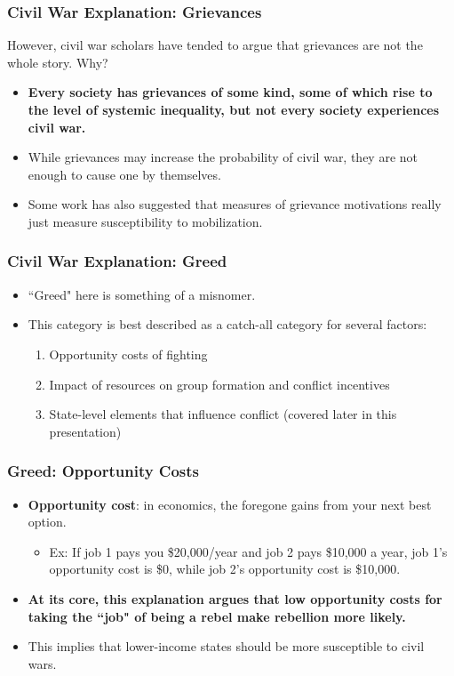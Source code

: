 \documentclass{beamer}
\begin{document}
\begin{frame} 
	\frametitle{\LARGE{Civil War Explanation: Grievances}}
However, civil war scholars have tended to argue that grievances are not the whole story. Why?
	\begin{itemize}
		\item \textbf{Every society has grievances of some kind, some of which rise to the level of systemic inequality, but not every society experiences civil war.} \pause
		\item While grievances may increase the probability of civil war, they are not enough to cause one by themselves. \pause
		\item Some work has also suggested that measures of grievance motivations really just measure susceptibility to mobilization.
	\end{itemize}
\end{frame}

\begin{frame} 
\frametitle{\LARGE{Civil War Explanation: Greed}}
	\begin{itemize}
		\item ``Greed" here is something of a misnomer. \pause
		\item This category is best described as a catch-all category for several factors: \pause
		\begin{enumerate}
			\item Opportunity costs of fighting
			\item Impact of resources on group formation and conflict incentives
			\item State-level elements that influence conflict (covered later in this presentation)
		\end{enumerate} 
	\end{itemize}
\end{frame}

\begin{frame} 
\frametitle{\LARGE{Greed: Opportunity Costs}}
\begin{itemize}
	\item \textbf{Opportunity cost}: in economics, the foregone gains from your next best option. \pause
	\begin{itemize}
		\item Ex: If job 1 pays you \$20,000/year and job 2 pays \$10,000 a year, job 1's opportunity cost is \$0, while job 2's opportunity cost is \$10,000. \pause
	\end{itemize}
	\item \textbf{At its core, this explanation argues that low opportunity costs for taking the ``job" of being a rebel make rebellion more likely.} \pause
	\item This implies that lower-income states should be more susceptible to civil wars.
\end{itemize}
\end{frame}
\end{document}

